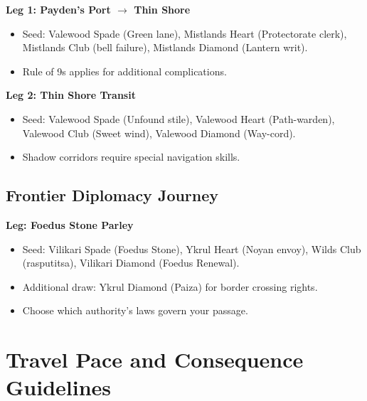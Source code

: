\textbf{Leg 1: Payden's Port $\rightarrow$ Thin Shore}
\begin{itemize}
    \item Seed: Valewood Spade (Green lane), Mistlands Heart (Protectorate clerk), Mistlands Club (bell failure), Mistlands Diamond (Lantern writ).
    \item Rule of 9s applies for additional complications.
\end{itemize}

\textbf{Leg 2: Thin Shore Transit}
\begin{itemize}
    \item Seed: Valewood Spade (Unfound stile), Valewood Heart (Path-warden), Valewood Club (Sweet wind), Valewood Diamond (Way-cord).
    \item Shadow corridors require special navigation skills.
\end{itemize}

\subsection{Frontier Diplomacy Journey}\label{subsec:frontier_diplomacy}

\textbf{Leg: Foedus Stone Parley}
\begin{itemize}
    \item Seed: Vilikari Spade (Foedus Stone), Ykrul Heart (Noyan envoy), Wilds Club (rasputitsa), Vilikari Diamond (Foedus Renewal).
    \item Additional draw: Ykrul Diamond (Paiza) for border crossing rights.
    \item Choose which authority's laws govern your passage.
\end{itemize}

\section{Travel Pace and Consequence Guidelines}\label{sec:pace_consequences}

